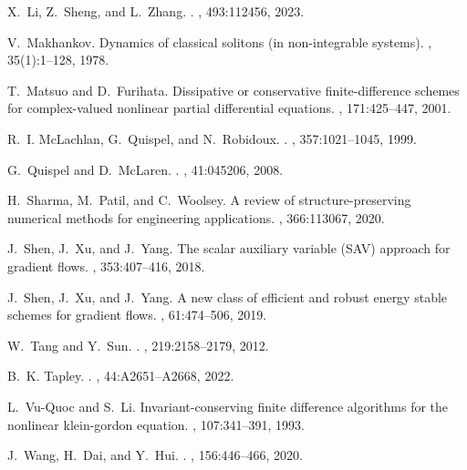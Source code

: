 \documentclass[fleqn,11pt]{elsarticle}
\numberwithin{equation}{section}
\begin{document}
\begin{thebibliography}{10}
X.~Li, Z.~Sheng, and L.~Zhang.
.
, 493:112456, 2023.

V.~Makhankov.
\newblock Dynamics of classical solitons (in non-integrable systems).
, 35(1):1--128, 1978.

T.~Matsuo and D.~Furihata.
\newblock Dissipative or conservative finite-difference schemes for complex-valued nonlinear partial differential equations.
, 171:425--447, 2001.

R.~I. McLachlan, G.~Quispel, and N.~Robidoux.
.
, 357:1021--1045, 1999.

G.~Quispel and D.~McLaren.
.
, 41:045206, 2008.

H.~Sharma, M.~Patil, and C.~Woolsey.
\newblock A review of structure-preserving numerical methods for engineering applications.
, 366:113067, 2020.

J.~Shen, J.~Xu, and J.~Yang.
\newblock The scalar auxiliary variable ({{SAV}}) approach for gradient flows.
, 353:407--416, 2018.

J.~Shen, J.~Xu, and J.~Yang.
\newblock A new class of efficient and robust energy stable schemes for gradient flows.
, 61:474--506, 2019.

W.~Tang and Y.~Sun.
.
, 219:2158--2179, 2012.

B.~K. Tapley.
.
, 44:A2651--A2668, 2022.

L.~{Vu-Quoc} and S.~Li.
\newblock Invariant-conserving finite difference algorithms for the nonlinear klein-gordon equation.
, 107:341--391, 1993.

J.~Wang, H.~Dai, and Y.~Hui.
.
, 156:446--466, 2020.


\end{thebibliography}
\end{document}

